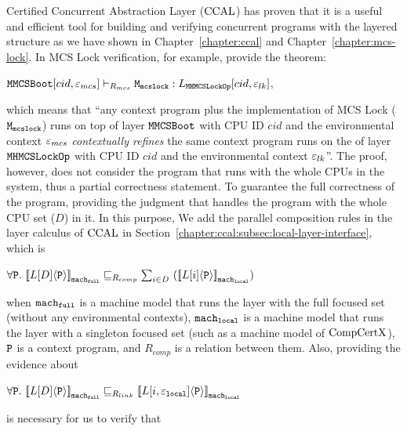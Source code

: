 Certified Concurrent Abstraction Layer  ($\mathrm{CCAL}$) 
has proven that it is a useful and efficient tool 
for building and verifying concurrent programs with the layered structure 
as we have shown in Chapter~\ref{chapter:ccal} and Chapter~\ref{chapter:mcs-lock}.
In MCS Lock verification, for example, provide 
the theorem:
\begin{center}
${\mathrm{\texttt{MMCSBoot}}}[cid, {\varepsilon}_{mcs}] \vdash_{R_{mcs}} {\mathrm{\texttt{M}}}_{{\mathrm{\texttt{mcslock}}}} : L_{{\mathrm{\texttt{MHMCSLockOp}}}}[cid, {\varepsilon}_{lk}]$,
\end{center}
which means that ``any context program plus the implementation of MCS Lock (${\mathrm{\texttt{M}}}_{{\mathrm{\texttt{mcslock}}}}$) runs on top of 
  layer ${\mathrm{\texttt{MMCSBoot}}}$ with CPU ID $cid$ and the environmental context ${\varepsilon}_{mcs}$ \textit{contextually refines}
 the same context program runs on the of  layer ${\mathrm{\texttt{MHMCSLockOp}}}$ with CPU ID $cid$ and the environmental context ${\varepsilon}_{lk}$''. 
The proof, however, does not consider the program that runs with the whole CPUs in the system, thus a partial correctness statement. 
To guarantee the full correctness of the program,
providing the judgment that handles the program with the whole CPU set ($D$) in it. 
In this purpose, 
We add the parallel composition rules in the layer calculus of $\mathrm{CCAL}$ in Section~\ref{chapter:ccal:subsec:local-layer-interface}, which is 
\begin{center}
$\forall \codeinmath{P}. \ \semwmachine{L[D]}{\codeinmath{P}}{\codeinmath{mach}_{\codeinmath{full}}} \refines_{R_{comp}} \sum_{i \in D}\  (\semwmachine{L[i]}{\codeinmath{P}}{\codeinmath{mach}_{\codeinmath{local}}})$
\end{center}
when ${\mathrm{\texttt{mach}}}_{{\mathrm{\texttt{full}}}}$ is a machine model that runs the layer with the full focused set (without any environmental contexts),
${\mathrm{\texttt{mach}}}_{{\mathrm{\texttt{local}}}}$ is a machine model that runs the layer with a singleton focused set (such as a machine model of $\mathrm{CompCertX}$),
${\mathrm{\texttt{P}}}$ is a context program, 
and $R_{comp}$ is a relation between them.
Also, 
providing the evidence about
\begin{center}
$\forall \codeinmath{P}. \ \semwmachine{L[D]}{\codeinmath{P}}{\codeinmath{mach}_{\codeinmath{full}}} \refines_{R_{link}} \semwmachine{L[i, \oracle_{\codeinmath{local}}]}{\codeinmath{P}}{\codeinmath{mach}_{\codeinmath{local}}}$
\end{center}
is necessary for us to verify that
